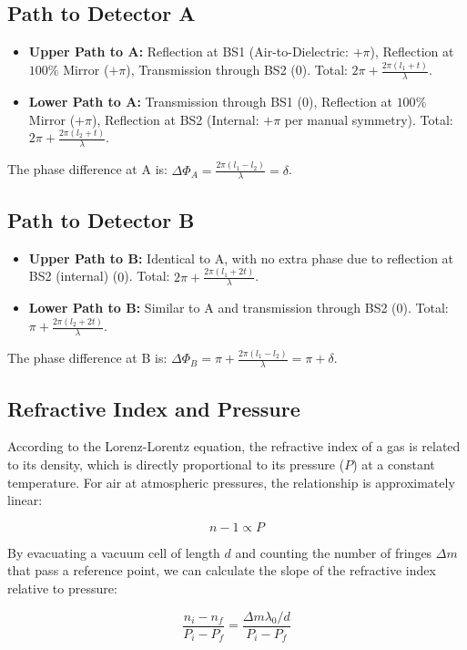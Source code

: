 \subsection{Path to Detector A}
\begin{itemize}
    \item \textbf{Upper Path to A:} Reflection at BS1 (Air-to-Dielectric: $+\pi$), Reflection at $100\%$ Mirror ($+\pi$), Transmission through BS2 ($0$). Total: $2\pi + \frac{2\pi(l_1 + t)}{\lambda}$.
    \item \textbf{Lower Path to A:} Transmission through BS1 ($0$), Reflection at $100\%$ Mirror ($+\pi$), Reflection at BS2 (Internal: $+\pi$ per manual symmetry). Total: $2\pi + \frac{2\pi(l_2 + t)}{\lambda}$.
\end{itemize}
The phase difference at A is: $\Delta\Phi_A = \frac{2\pi(l_1 - l_2)}{\lambda} = \delta$.

\subsection{Path to Detector B}
\begin{itemize}
    \item \textbf{Upper Path to B:} Identical to A, with no extra phase due to reflection at BS2 (internal) ($0$). Total: $2\pi + \frac{2\pi(l_1 + 2t)}{\lambda}$.
    \item \textbf{Lower Path to B:} Similar to A and transmission through BS2 ($0$). Total: $\pi + \frac{2\pi(l_2 + 2t)}{\lambda}$.
\end{itemize}
The phase difference at B is: $\Delta\Phi_B = \pi + \frac{2\pi(l_1 - l_2)}{\lambda} = \pi + \delta$.

\subsection{Refractive Index and Pressure}

According to the Lorenz-Lorentz equation, the refractive index of a gas is related to its density, which is directly proportional to its pressure ($P$) at a constant temperature. For air at atmospheric pressures, the relationship is approximately linear:


$$n - 1 \propto P$$

By evacuating a vacuum cell of length $d$ and counting the number of fringes $\Delta m$ that pass a reference point, we can calculate the slope of the refractive index relative to pressure:


$$\frac{n_i - n_f}{P_i - P_f} = \frac{\Delta m \lambda_0 / d}{P_i - P_f}$$

